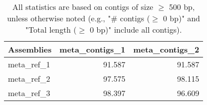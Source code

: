\documentclass[12pt,a4paper]{article}
\begin{document}
\begin{table}[ht]
\begin{center}
\caption{All statistics are based on contigs of size $\geq$ 500 bp, unless otherwise noted (e.g., "\# contigs ($\geq$ 0 bp)" and "Total length ($\geq$ 0 bp)" include all contigs).}
\begin{tabular}{|l*{2}{|r}|}
\hline
Assemblies & meta\_contigs\_1 & meta\_contigs\_2 \\ \hline
meta\_ref\_1 & 91.587 & 91.587 \\ \hline
meta\_ref\_2 & 97.575 & 98.115 \\ \hline
meta\_ref\_3 & 98.397 & 96.609 \\ \hline
\end{tabular}
\end{center}
\end{table}
\end{document}
